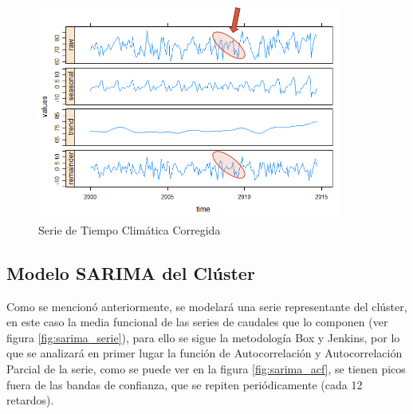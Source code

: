 \documentclass[12pt,oneside]{book}\usepackage[]{graphicx}\usepackage[]{color}
\theoremstyle{definition} %
\begin{document}
\begin{figure}[H]
\centering
\includegraphics[width=10cm]{Cap3-Metodologia/limpieza2.png}
\caption{Serie de Tiempo Climática Corregida}
\label{fig:climaLimp2}

\end{figure}


% 
% 
% 


\subsection{Modelo SARIMA del Clúster}

Como se mencionó anteriormente, se modelará una serie representante del clúster, en este caso la media funcional de las series de caudales que lo componen (ver figura \ref{fig:sarima_serie}), para ello se sigue la metodología Box y Jenkins, por lo que se analizará en primer lugar la función de Autocorrelación y Autocorrelación Parcial de la serie, como se puede ver en la figura \ref{fig:sarima_acf}, se tienen picos fuera de las bandas de confianza, que se repiten periódicamente (cada 12 retardos). 
\end{document}
